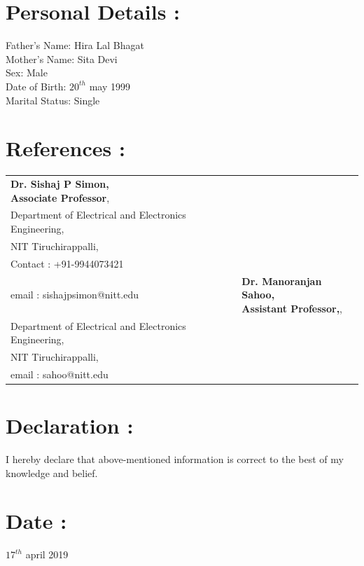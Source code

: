 \documentclass[a4paper, 12 pt]{article}
\begin{document}
\section*{Personal Details :}
\hspace{1cm}Father's Name: Hira Lal Bhagat\\
\hspace{1cm}Mother's Name: Sita Devi\\
\hspace{1cm}Sex: Male\\
\hspace{1cm}Date of Birth: $20^{th}$ may 1999\\
\hspace{1cm}Marital Status: Single
\section*{References :}
\begin{table}[h]
\begin{tabular}{p{8 cm}|p{8cm}}
\centering {\bf Dr. Sishaj P Simon,\\Associate Professor},\\Department of Electrical and Electronics Engineering,\\ NIT Tiruchirappalli,\\ Contact : +91-9944073421\\email : sishajpsimon@nitt.edu &\centering  {\bf Dr. Manoranjan Sahoo,\\Assistant Professor,},\\Department of Electrical and Electronics Engineering,\\ NIT Tiruchirappalli,\\ email : sahoo@nitt.edu
\end{tabular}
\end{table}
\section*{Declaration :}
\hspace{1cm}I hereby declare that above-mentioned information is correct to the best of my \\
\hspace{1cm}knowledge and belief.
\section*{Date :}
\hspace{1cm}$17^{th}$ april 2019
\end{document}
